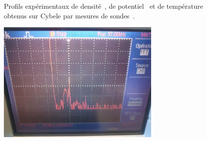\begin{refsection}
\begin{figure}[!htbp]
  \centering
    \caption{Profils expérimentaux de densité~, de
    potentiel~ et de
    température~ obtenus sur Cybele par
    mesures de sondes~\parencite{SimoninHDR}.}
    \label{4-CybeleExp}
\end{figure}
\begin{figure}[!htbp]
  \centering
    \includegraphics[height=6cm]{figures/4-CybeleFourierSignal.jpg}

\end{figure}
\end{refsection}
